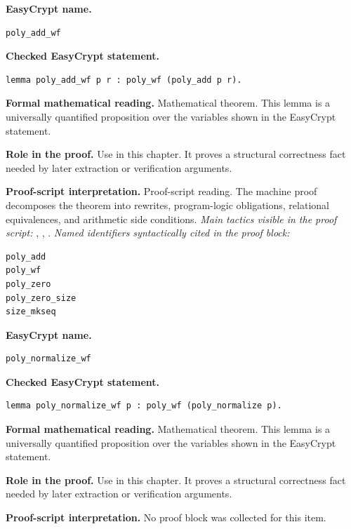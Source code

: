 \begin{formaltheorem}
\noindent\textbf{EasyCrypt name.}
\begin{lstlisting}[language=EasyCrypt,basicstyle=\ttfamily\scriptsize]
poly_add_wf
\end{lstlisting}
\noindent\textbf{Checked EasyCrypt statement.}
\begin{lstlisting}[language=EasyCrypt,basicstyle=\ttfamily\scriptsize]
lemma poly_add_wf p r : poly_wf (poly_add p r).
\end{lstlisting}
\noindent\textbf{Formal mathematical reading.}
Mathematical theorem. This lemma is a universally quantified proposition over the variables shown in the EasyCrypt statement.

\noindent\textbf{Role in the proof.}
Use in this chapter. It proves a structural correctness fact needed by later extraction or verification arguments.

\noindent\textbf{Proof-script interpretation.}
Proof-script reading. The machine proof decomposes the theorem into rewrites, program-logic obligations, relational equivalences, and arithmetic side conditions.
\emph{Main tactics visible in the proof script:} , , .
\emph{Named identifiers syntactically cited in the proof block:}
\begin{lstlisting}[language=EasyCrypt,basicstyle=\ttfamily\scriptsize]
poly_add
poly_wf
poly_zero
poly_zero_size
size_mkseq
\end{lstlisting}

\end{formaltheorem}

\begin{formaltheorem}
\noindent\textbf{EasyCrypt name.}
\begin{lstlisting}[language=EasyCrypt,basicstyle=\ttfamily\scriptsize]
poly_normalize_wf
\end{lstlisting}
\noindent\textbf{Checked EasyCrypt statement.}
\begin{lstlisting}[language=EasyCrypt,basicstyle=\ttfamily\scriptsize]
lemma poly_normalize_wf p : poly_wf (poly_normalize p).
\end{lstlisting}
\noindent\textbf{Formal mathematical reading.}
Mathematical theorem. This lemma is a universally quantified proposition over the variables shown in the EasyCrypt statement.

\noindent\textbf{Role in the proof.}
Use in this chapter. It proves a structural correctness fact needed by later extraction or verification arguments.

\noindent\textbf{Proof-script interpretation.}
No proof block was collected for this item.

\end{formaltheorem}

